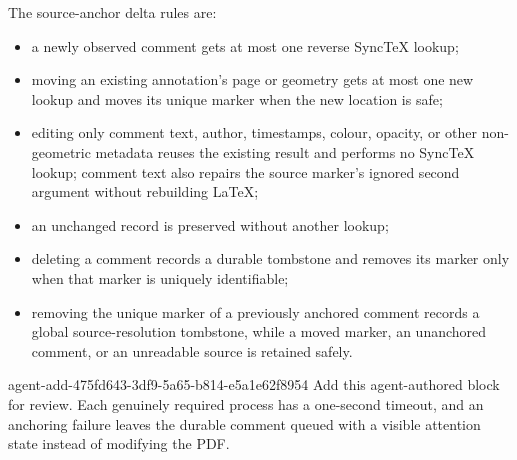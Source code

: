 The source-anchor delta rules are:
\begin{itemize}
  \item a newly observed comment gets at most one reverse SyncTeX lookup;
  \item moving an existing annotation's page or geometry gets at most one new lookup and moves its unique marker when the new location is safe;
  \item editing only comment text, author, timestamps, colour, opacity, or other non-geometric metadata reuses the existing result and performs no SyncTeX lookup; comment text also repairs the source marker's ignored second argument without rebuilding LaTeX;
  \item an unchanged  record is preserved without another lookup;
  \item deleting a comment records a durable tombstone and removes its marker only when that marker is uniquely identifiable;
  \item removing the unique marker of a previously anchored comment records a global source-resolution tombstone, while a moved marker, an unanchored comment, or an unreadable source is retained safely.
\end{itemize}
\agentProposedEdit
  {agent-add-475fd643-3df9-5a65-b814-e5a1e62f8954}
  {Add this agent-authored block for review.}
  {}
  {Each genuinely required  process has a one-second timeout, and an anchoring failure leaves the durable comment queued with a visible attention state instead of modifying the PDF.}

